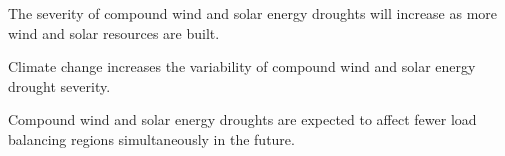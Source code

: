 \documentclass{agujournal2019}
\begin{document}


\begin{keypoints}
\item The severity of compound wind and solar energy droughts will increase as more wind and solar resources are built. 
\item Climate change increases the variability of compound wind and solar energy drought severity. 
\item Compound wind and solar energy droughts are expected to affect fewer load balancing regions simultaneously in the future.
\end{keypoints}

%
%

%
%

\end{document}
